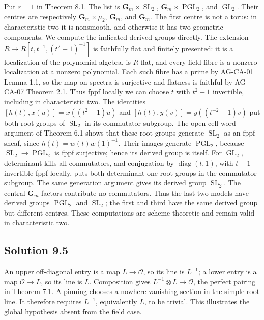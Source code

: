 \documentclass[11pt,a4paper,openany]{report}
\begin{document}
Put \(r=1\) in Theorem 8.1. The list is \(\mathbf G_m\times\operatorname{SL}_2\), \(\mathbf G_m\times\operatorname{PGL}_2\), and \(\operatorname{GL}_2\). Their centres are respectively \(\mathbf G_m\times\mu_2\), \(\mathbf G_m\), and \(\mathbf G_m\). The first centre is not a torus: in characteristic two it is nonsmooth, and otherwise it has two geometric components. We compute the indicated derived groups directly. The extension \(R\to R[t,t^{-1},(t^2-1)^{-1}]\) is faithfully flat and finitely presented: it is a localization of the polynomial algebra, is \(R\)-flat, and every field fibre is a nonzero localization at a nonzero polynomial. Each such fibre has a prime by AG-CA-01 Lemma 1.1, so the map on spectra is surjective and flatness is faithful by AG-CA-07 Theorem 2.1. Thus fppf locally we can choose \(t\) with \(t^2-1\) invertible, including in characteristic two. The identities \([h(t),x(u)]=x((t^2-1)u)\) and \([h(t),y(v)]=y((t^{-2}-1)v)\) put both root groups of \(\operatorname{SL}_2\) in its commutator subgroup. The open cell word argument of Theorem 6.1 shows that these root groups generate \(\operatorname{SL}_2\) as an fppf sheaf, since \(h(t)=w(t)w(1)^{-1}\). Their images generate \(\operatorname{PGL}_2\), because \(\operatorname{SL}_2\to\operatorname{PGL}_2\) is fppf surjective; hence its derived group is itself. For \(\operatorname{GL}_2\), determinant kills all commutators, and conjugation by \(\operatorname{diag}(t,1)\), with \(t-1\) invertible fppf locally, puts both determinant-one root groups in the commutator subgroup. The same generation argument gives its derived group \(\operatorname{SL}_2\). The central \(\mathbf G_m\) factors contribute no commutators. Thus the last two models have derived groups \(\operatorname{PGL}_2\) and \(\operatorname{SL}_2\); the first and third have the same derived group but different centres. These computations are scheme-theoretic and remain valid in characteristic two.

\subsection{Solution 9.5}\label{AG-RG-03-solution-9.5}

An upper off-diagonal entry is a map \(L\to\mathcal O\), so its line is \(L^{-1}\); a lower entry is a map \(\mathcal O\to L\), so its line is \(L\). Composition gives \(L^{-1}\otimes L\to\mathcal O\), the perfect pairing in Theorem 7.1. A pinning chooses a nowhere-vanishing section in the simple root line. It therefore requires \(L^{-1}\), equivalently \(L\), to be trivial. This illustrates the global hypothesis absent from the field case.
\end{document}
